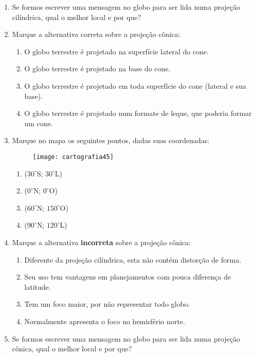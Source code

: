 {\begin{enumerate}
\item Se formos escrever uma mensagem no globo para ser lida numa projeção cilíndrica, qual o melhor local e por que?

\item Marque a alternativa correta sobre a projeção cônica:
\begin{enumerate}
\item O globo terrestre é projetado na superfície lateral do cone.
\item O globo terrestre é projetado na base do cone.
\item O globo terrestre é projetado em toda superfície do cone (lateral e sua base).
\item O globo terrestre é projetado num formate de leque, que poderia formar um cone.
\end{enumerate}

\item Marque no mapa os seguintes pontos, dadas suas coordenadas:

\begin{figure}[H]
\centering
\texttt{[image: cartografia45]}

\end{figure}

\begin{enumerate}
\item ($30^{\circ}$S; $30^{\circ}$L)
\item ($0^{\circ}$N; $0^{\circ}$O)
\item ($60^{\circ}$N; $150^{\circ}$O)
\item ($90^{\circ}$N; $120^{\circ}$L)
\end{enumerate}

\item Marque a alternativa \textbf{incorreta} sobre a projeção cônica:
\begin{enumerate}
\item Diferente da projeção cilíndrica, esta não contém distorção de forma.
\item Seu uso tem vantagens em planejamentos com pouca diferença de latitude.
\item Tem um foco maior, por não representar todo globo.
\item Normalmente apresenta o foco no hemisfério norte.
\end{enumerate}

\item Se formos escrever uma mensagem no globo para ser lida numa projeção cônica, qual o melhor local e por que?




\end{enumerate}}
